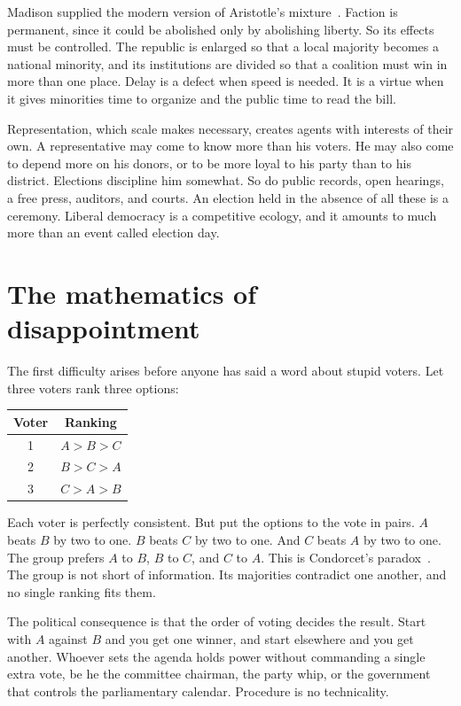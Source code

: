 \documentclass[12pt,a4paper]{book}
\begin{document}
Madison supplied the modern version of Aristotle's mixture~\cite{Madison1787}. Faction is permanent, since it could be abolished only by abolishing liberty. So its effects must be controlled. The republic is enlarged so that a local majority becomes a national minority, and its institutions are divided so that a coalition must win in more than one place. Delay is a defect when speed is needed. It is a virtue when it gives minorities time to organize and the public time to read the bill.

Representation, which scale makes necessary, creates agents with interests of their own. A representative may come to know more than his voters. He may also come to depend more on his donors, or to be more loyal to his party than to his district. Elections discipline him somewhat. So do public records, open hearings, a free press, auditors, and courts. An election held in the absence of all these is a ceremony. Liberal democracy is a competitive ecology, and it amounts to much more than an event called election day.

\section{The mathematics of disappointment}

The first difficulty arises before anyone has said a word about stupid voters. Let three voters rank three options:

\begin{center}
\begin{tabular}{c|c}
Voter & Ranking \\
\hline
1 & $A \mathrel{>} B \mathrel{>} C$ \\
2 & $B \mathrel{>} C \mathrel{>} A$ \\
3 & $C \mathrel{>} A \mathrel{>} B$
\end{tabular}
\end{center}

Each voter is perfectly consistent. But put the options to the vote in pairs. $A$ beats $B$ by two to one. $B$ beats $C$ by two to one. And $C$ beats $A$ by two to one. The group prefers $A$ to $B$, $B$ to $C$, and $C$ to $A$. This is Condorcet's paradox~\cite{Condorcet1785}. The group is not short of information. Its majorities contradict one another, and no single ranking fits them.

The political consequence is that the order of voting decides the result. Start with $A$ against $B$ and you get one winner, and start elsewhere and you get another. Whoever sets the agenda holds power without commanding a single extra vote, be he the committee chairman, the party whip, or the government that controls the parliamentary calendar. Procedure is no technicality.
\end{document}
